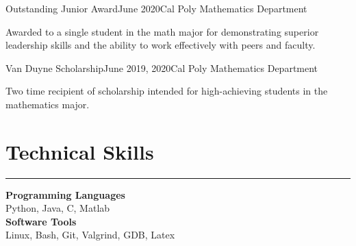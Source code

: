 \documentclass{resume_new} %
\begin{document}
\begin{paracol}{2}
\begin{resumeList}{Outstanding Junior Award}{June 2020}{Cal Poly Mathematics Department}{}
\item Awarded to a single student in the math major for demonstrating superior leadership skills and the ability to work effectively with peers and faculty.
\end{resumeList}

\begin{resumeList}{Van Duyne Scholarship}{June 2019, 2020}{Cal Poly Mathematics Department}{}
\item Two time recipient of scholarship intended for high-achieving students in the mathematics major.
\end{resumeList}

\section*{Technical Skills}
\hrule

{\bf Programming Languages} \\
Python, Java, C, Matlab \\
{\bf Software Tools} \\
Linux, Bash, Git, Valgrind, GDB, Latex


\vspace{.05cm}

\vspace{.05cm}


\end{paracol}
\end{document}
